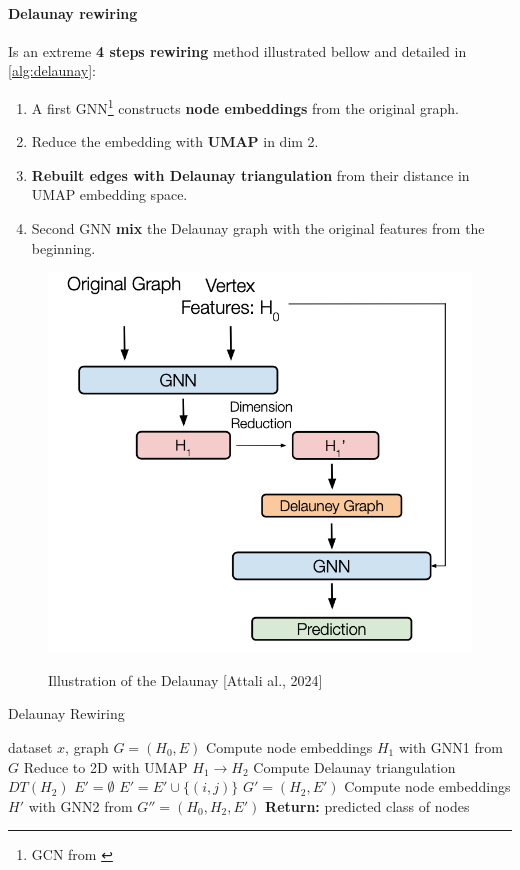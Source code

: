 \documentclass{article}
\theoremstyle{plain}
\theoremstyle{definition}
\theoremstyle{remark}
\begin{document}
\paragraph{Delaunay rewiring}
Is an extreme \textbf{4 steps rewiring} method illustrated bellow and detailed 
in \cref{alg:delaunay}:
\begin{enumerate}
    \item A first GNN\footnote{GCN from \cite{kipf2017semi}} constructs 
        \textbf{node embeddings} from the original graph.
    \item Reduce the embedding with \textbf{UMAP} in dim 2.
    \item \textbf{Rebuilt edges with Delaunay triangulation} from their distance in UMAP embedding space.
    \item Second GNN \textbf{mix} the Delaunay graph with the original features 
    from the beginning.
\end{enumerate}
\begin{figure}[ht!]
    \begin{center}
    \vskip -0.2in
    \includegraphics[width=0.8\columnwidth]{figures/Rewiring_method_s.png}
    \caption{Illustration of the Delaunay [Attali al., 2024] \cite{attali2024delaunay}}
    \vskip -0.2in
    \label{fig:delaunay_rewiring}
    
    \end{center}
\end{figure}

\begin{algorithm}[htb!]
    \caption{Delaunay Rewiring}
    \label{alg:delaunay}
 \begin{algorithmic}
     dataset $x$, graph $G = (H_0, E)$
    \STATE Compute node embeddings $H_1$ with GNN1 from $G$ 
    \STATE Reduce  to 2D with UMAP $H_1 \to H_2$
    \STATE Compute Delaunay triangulation $DT(H_2)$
    \STATE $E' = \emptyset$
        \STATE $E' = E' \cup \{(i, j)\}$  
    \ENDFOR
    \STATE  $G' = (H_2, E')$  
    \STATE Compute node embeddings $H'$ with GNN2 from $G'' = (H_0, H_2, E')$
    {\bfseries Return:}  predicted class of nodes
 \end{algorithmic}
 \end{algorithm}
\end{document}
